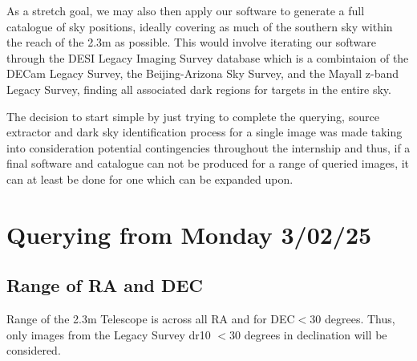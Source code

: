 \documentclass{article}
\begin{document}
As a stretch goal, we may also then apply our software to generate a full catalogue of sky positions, ideally covering as much of the southern sky within the reach of the 2.3m as possible. This would involve iterating our software through the DESI Legacy Imaging Survey database which is a combintaion of the DECam Legacy Survey, the Beijing-Arizona Sky Survey, and the Mayall z-band Legacy Survey, finding all associated dark regions for targets in the entire sky.

The decision to start simple by just trying to complete the querying, source extractor and dark sky identification process for a single image was made taking into consideration potential contingencies throughout the internship and thus, if a final software and catalogue can not be produced for a range of queried images, it can at least be done for one which can be expanded upon.

\section{Querying from Monday 3/02/25}
\subsection{Range of RA and DEC}
Range of the 2.3m Telescope is across all RA and for DEC$<$30 degrees. 
Thus, only images from the Legacy Survey dr10 $<$30 degrees in declination will be considered.
\end{document}
